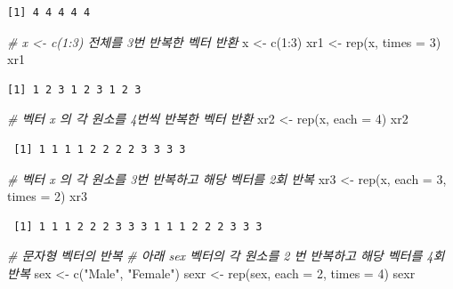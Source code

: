 \documentclass[
  11pt,
]{krantz}
\newenvironment{Shaded}{\begin{snugshade}}{\end{snugshade}}
\newcommand{\AttributeTok}[1]{\textcolor[rgb]{0.61,0.61,0.61}{#1}}
\newcommand{\CommentTok}[1]{\textcolor[rgb]{0.37,0.37,0.37}{\textit{#1}}}
\newcommand{\DecValTok}[1]{\textcolor[rgb]{0.06,0.06,0.06}{#1}}
\newcommand{\FunctionTok}[1]{\textcolor[rgb]{0,0,0}{#1}}
\newcommand{\NormalTok}[1]{#1}
\newcommand{\OtherTok}[1]{\textcolor[rgb]{0.37,0.37,0.37}{#1}}
\newcommand{\SpecialCharTok}[1]{\textcolor[rgb]{0,0,0}{#1}}
\newcommand{\StringTok}[1]{\textcolor[rgb]{0.5,0.5,0.5}{#1}}
\begin{document}
\begin{verbatim}
[1] 4 4 4 4 4
\end{verbatim}

\begin{Shaded}
\begin{Highlighting}[]
\CommentTok{\# x \textless{}{-} c(1:3) 전체를 3번 반복한 벡터 반환}
\NormalTok{x }\OtherTok{\textless{}{-}} \FunctionTok{c}\NormalTok{(}\DecValTok{1}\SpecialCharTok{:}\DecValTok{3}\NormalTok{)}
\NormalTok{xr1 }\OtherTok{\textless{}{-}} \FunctionTok{rep}\NormalTok{(x, }\AttributeTok{times =} \DecValTok{3}\NormalTok{)}
\NormalTok{xr1}
\end{Highlighting}
\end{Shaded}

\begin{verbatim}
[1] 1 2 3 1 2 3 1 2 3
\end{verbatim}

\begin{Shaded}
\begin{Highlighting}[]
\CommentTok{\# 벡터 x 의 각 원소를 4번씩 반복한 벡터 반환}
\NormalTok{xr2 }\OtherTok{\textless{}{-}} \FunctionTok{rep}\NormalTok{(x, }\AttributeTok{each =} \DecValTok{4}\NormalTok{)}
\NormalTok{xr2}
\end{Highlighting}
\end{Shaded}

\begin{verbatim}
 [1] 1 1 1 1 2 2 2 2 3 3 3 3
\end{verbatim}

\begin{Shaded}
\begin{Highlighting}[]
\CommentTok{\# 벡터 x 의 각 원소를 3번 반복하고 해당 벡터를 2회 반복}
\NormalTok{xr3 }\OtherTok{\textless{}{-}} \FunctionTok{rep}\NormalTok{(x, }\AttributeTok{each =} \DecValTok{3}\NormalTok{, }\AttributeTok{times =} \DecValTok{2}\NormalTok{)}
\NormalTok{xr3}
\end{Highlighting}
\end{Shaded}

\begin{verbatim}
 [1] 1 1 1 2 2 2 3 3 3 1 1 1 2 2 2 3 3 3
\end{verbatim}

\begin{Shaded}
\begin{Highlighting}[]
\CommentTok{\# 문자형 벡터의 반복}
\CommentTok{\# 아래 sex 벡터의 각 원소를 2 번 반복하고 해당 벡터를 4회 반복}
\NormalTok{sex }\OtherTok{\textless{}{-}} \FunctionTok{c}\NormalTok{(}\StringTok{"Male"}\NormalTok{, }\StringTok{"Female"}\NormalTok{)}
\NormalTok{sexr }\OtherTok{\textless{}{-}} \FunctionTok{rep}\NormalTok{(sex, }\AttributeTok{each =} \DecValTok{2}\NormalTok{, }\AttributeTok{times =} \DecValTok{4}\NormalTok{)}
\NormalTok{sexr}
\end{Highlighting}
\end{Shaded}
\end{document}
